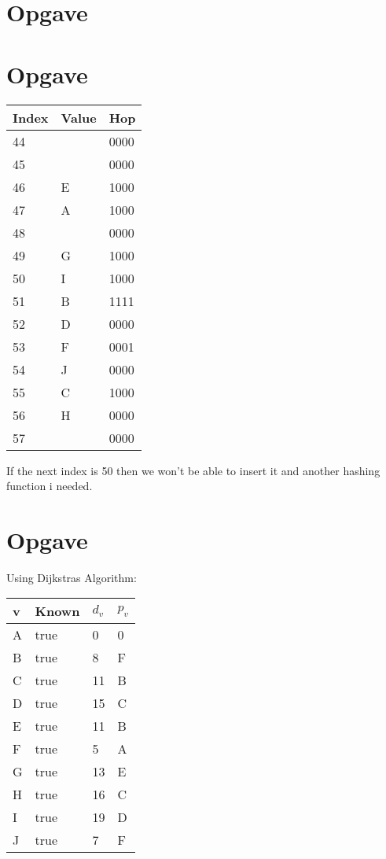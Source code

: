 \documentclass{article}
\begin{document}
\section{Opgave} %
\section{Opgave} %
\begin{table}[H]
\centering
\begin{tabular}{|l|l|l|}
\hline
\rowcolor[HTML]{C0C0C0} 
Index  & Value & Hop \\ \hline
44       & & 0000   \\ \hline
45       & & 0000   \\ \hline
46       & E & 1000   \\ \hline
47       & A & 1000   \\ \hline
48       & & 0000   \\ \hline
49       & G & 1000   \\ \hline
50       & I & 1000   \\ \hline
51       & B & 1111   \\ \hline
52       & D & 0000   \\ \hline
53       & F & 0001   \\ \hline
54       & J & 0000   \\ \hline
55       & C & 1000   \\ \hline
56       & H & 0000   \\ \hline
57       & & 0000   \\ \hline
\end{tabular}
\end{table}

If the next index is 50 then we won't be able to insert it and another hashing function i needed.

\section{Opgave} %

Using Dijkstras Algorithm:
\begin{table}[H]
\centering
\begin{tabular}{|l|l|l|l|}
\hline
\rowcolor[HTML]{C0C0C0} 
v  & Known & $d_v$  & $p_v$     \\ \hline
A  & true  & 0     & 0    \\ \hline
B  & true  & 8     & F   \\ \hline
C  & true  & 11    & B   \\ \hline
D  & true  & 15    & C   \\ \hline
E  & true  & 11    & B   \\ \hline
F  & true  & 5     & A   \\ \hline
G  & true  & 13    & E   \\ \hline
H  & true  & 16    & C   \\ \hline
I  & true  & 19    & D    \\ \hline
J  & true  & 7     & F   \\ \hline
\end{tabular}
\end{table}
\end{document}
